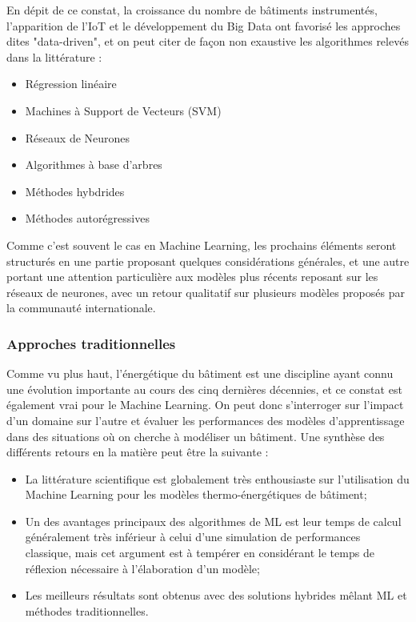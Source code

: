         En dépit de ce constat, la croissance du nombre de bâtiments instrumentés,
        l'apparition de l'IoT et le développement du Big Data ont favorisé les approches dites "data-driven", et on peut citer de façon non exaustive les algorithmes relevés dans la
        littérature\cite{ZHANG2021116452} :
        \begin{itemize}
            \item Régression linéaire
            \item Machines à Support de Vecteurs (SVM)
            \item Réseaux de Neurones
            \item Algorithmes à base d'arbres
            \item Méthodes hybdrides
            \item Méthodes autorégressives
        \end{itemize}

        Comme c'est souvent le cas en Machine Learning, les prochains éléments seront structurés en
        une partie proposant quelques considérations générales, et une autre portant une attention
        particulière aux modèles plus récents reposant sur les réseaux de neurones, avec un retour
        qualitatif sur plusieurs modèles proposés par la communauté internationale.

        \subsubsection{Approches traditionnelles}\label{subsubsec:approches-traditionnelles}

            Comme vu plus haut, l'énergétique du bâtiment est une discipline ayant connu une
            évolution importante au cours des cinq dernières décennies, et ce constat est
            également vrai pour le Machine Learning\cite{WML}.
            On peut donc s'interroger sur l'impact d'un domaine sur l'autre et évaluer les
            performances des modèles d'apprentissage dans des situations où on cherche à
            modéliser un bâtiment.
            Une synthèse des différents retours en la matière peut être\cite{BPD_AI_DT_review} la suivante :

            \begin{itemize}
                \item La littérature scientifique est globalement très enthousiaste sur
                l'utilisation du Machine Learning pour les modèles thermo-énergétiques de bâtiment;
                \item Un des avantages principaux des algorithmes de ML est leur temps de calcul
                généralement très inférieur à celui d'une simulation de performances classique,
                mais cet argument est à tempérer en considérant le temps de réflexion
                nécessaire à l'élaboration d'un modèle;
                \item Les meilleurs résultats sont obtenus avec des solutions hybrides mêlant
                ML et méthodes traditionnelles.
            \end{itemize}

